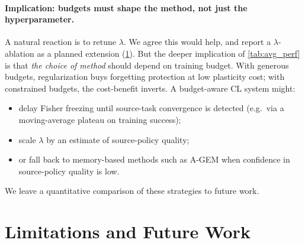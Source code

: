 \documentclass[11pt,a4paper]{article}
\begin{document}
\paragraph{Implication: budgets must shape the method, not just the
hyperparameter.} A natural reaction is to retune $\lambda$. We agree this
would help, and report a $\lambda$-ablation as a planned extension
(\cref{sec:limits}). But the deeper implication of \cref{tab:avg_perf} is
that \emph{the choice of method} should depend on training budget. With
generous budgets, regularization buys forgetting protection at low
plasticity cost; with constrained budgets, the cost-benefit inverts. A
budget-aware CL system might:
\begin{itemize}[leftmargin=1.5em,topsep=2pt,itemsep=1pt]
    \item delay Fisher freezing until source-task convergence is detected
        (e.g.\ via a moving-average plateau on training success);
    \item scale $\lambda$ by an estimate of source-policy quality;
    \item or fall back to memory-based methods such as A-GEM
        \cite{chaudhry2019agem} when confidence in source-policy quality
        is low.
\end{itemize}
We leave a quantitative comparison of these strategies to future work.

\section{Limitations and Future Work}
\label{sec:limits}
\end{document}
